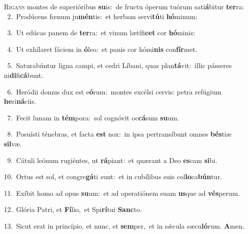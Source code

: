 \lettrine{\initial\textcolor{\initialcolor}{R}}{igans} montes de superióribus \textbf{su}\-is:~\star de fructu óperum tuórum sati\-\textbf{á}\-bitur \textbf{ter}\-ra:\\
{\numbfont\textcolor{\numbcolor}{~2.}}~Prodúcens fœnum ju\-\textbf{mén}\-tis:~\star et herbam servi\-\textbf{tú}\-ti \textbf{hó}\-minum:\par
{\numbfont\textcolor{\numbcolor}{~3.}}~Ut edúcas panem de \textbf{ter}\-ra:~\star et vinum lætífi\textbf{cet} cor \textbf{hó}\-minis:\par
{\numbfont\textcolor{\numbcolor}{~4.}}~Ut exhílaret fáciem in \textbf{ó}\-leo:~\star et panis cor hómi\textbf{nis} con\-\textbf{fír}\-met.\par
{\numbfont\textcolor{\numbcolor}{~5.}}~Saturabúntur ligna campi, et cedri Líbani, quas plan\-\textbf{tá}\-vit:~\star illic pásseres ni\-\textbf{di}\-fi\-\textbf{cá}\-bunt.\par
{\numbfont\textcolor{\numbcolor}{~6.}}~Heródii domus dux est e\-\textbf{ó}\-rum:~\star montes excélsi cervis: petra refúgium \textbf{he}\-ri\-\textbf{ná}\-ciis.\par
{\numbfont\textcolor{\numbcolor}{~7.}}~Fecit lunam in \textbf{tém}\-pora:~\star sol cognóvit oc\-\textbf{cá}\-sum \textbf{su}\-um.\par
{\numbfont\textcolor{\numbcolor}{~8.}}~Posuísti ténebras, et facta \textbf{est} nox:~\star in ipsa pertransíbunt omnes \textbf{bés}\-tiæ \textbf{sil}\-væ.\par
{\numbfont\textcolor{\numbcolor}{~9.}}~Cátuli leónum rugiéntes, ut \textbf{rá}\-piant:~\star et quærant a Deo \textbf{es}\-cam \textbf{si}\-bi.\par
{\numbfont\textcolor{\numbcolor}{10.}}~Ortus est sol, et congre\-\textbf{gá}\-ti sunt:~\star et in cubílibus suis col\-\textbf{lo}\-ca\-\textbf{bún}\-tur.\par
{\numbfont\textcolor{\numbcolor}{11.}}~Exíbit homo ad opus \textbf{su}\-um:~\star et ad operatiónem suam \textbf{us}\-que ad \textbf{vés}\-perum.\par
{\numbfont\textcolor{\numbcolor}{12.}}~Glória Patri, et \textbf{Fí}\-lio,~\star et Spi\-\textbf{rí}\-tui \textbf{Sanc}\-to.\par
{\numbfont\textcolor{\numbcolor}{13.}}~Sicut erat in princípio, et nunc, et \textbf{sem}\-per,~\star et in sǽcula sæcu\-\textbf{ló}\-rum. \textbf{A}\-men.\par
